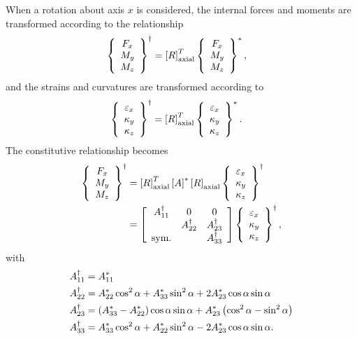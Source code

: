 When a rotation about axis $x$ is considered, the internal forces
and moments are transformed according to the relationship
\begin{align}
	\cubr{\cvvect{
		F_x \\
		M_y \\
		M_z
	}}^{\dagger}
	&= \sqbr{R}_{\text{axial}}^T
	\cubr{\cvvect{
		F_x \\
		M_y \\
		M_z
	}}^*
	,
\end{align}
and the strains and curvatures are transformed according to
\begin{align}
	\cubr{\cvvect{
		\varepsilon_x \\
		\kappa_y \\
		\kappa_z
	}}^{\dagger}
	&= \sqbr{R}_{\text{axial}}^T
	\cubr{\cvvect{
		\varepsilon_x \\
		\kappa_y \\
		\kappa_z
	}}^*
	.
\end{align}
The constitutive relationship becomes
\begin{align}
	\cubr{\cvvect{
		F_x \\
		M_y \\
		M_z
	}}^{\dagger}
	&=
	\sqbr{R}_{\text{axial}}^T \sqbr{A}^* \sqbr{R}_{\text{axial}}
	\cubr{\cvvect{
		\varepsilon_x \\
		\kappa_y \\
		\kappa_z \\
	}}^{\dagger}
	\nonumber \\
	&=
	\sqbr{\matr{ccc}{
		A_{11}^{\dagger} & 0 & 0 \\
		& A_{22}^{\dagger} & A_{23}^{\dagger} \\
		\text{sym.} & & A_{33}^{\dagger}
	}}
	\cubr{\cvvect{
		\varepsilon_x \\
		\kappa_y \\
		\kappa_z \\
	}}^{\dagger}
	,
\end{align}
with
\begin{subequations}
\begin{align}
	A_{11}^{\dagger} &= A_{11}^* \\
	A_{22}^{\dagger} &= A_{22}^* \cos^2\alpha + A_{33}^* \sin^2\alpha + 2 A_{23}^* \cos\alpha\sin\alpha \\
	A_{23}^{\dagger} &= \plbr{A_{33}^* - A_{22}^*} \cos\alpha\sin\alpha + A_{23}^* \plbr{\cos^2\alpha - \sin^2\alpha} \\
	A_{33}^{\dagger} &= A_{33}^* \cos^2\alpha + A_{22}^* \sin^2\alpha - 2 A_{23}^* \cos\alpha\sin\alpha
	.
\end{align}
\end{subequations}
